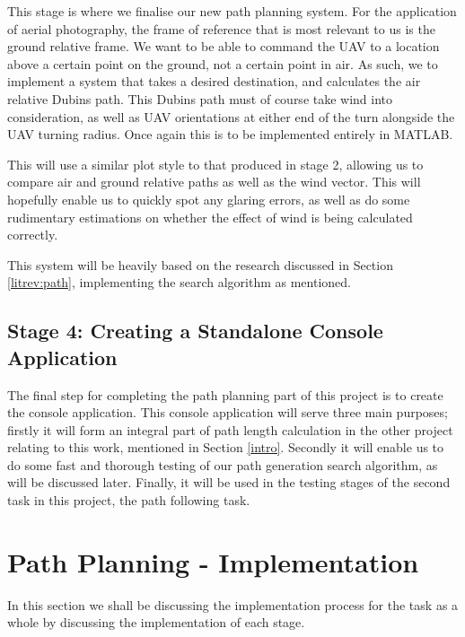 This stage is where we finalise our new path planning system. For the application of aerial photography, the frame of reference that is most relevant to us is the ground relative frame. We want to be able to command the UAV to a location above a certain point on the ground, not a certain point in air. As such, we to implement a system that takes a desired destination, and calculates the air relative Dubins path. This Dubins path must of course take wind into consideration, as well as UAV orientations at either end of the turn alongside the UAV turning radius. Once again this is to be implemented entirely in MATLAB. 

This will use a similar plot style to that produced in stage 2, allowing us to compare air and ground relative paths as well as the wind vector. This will hopefully enable us to quickly spot any glaring errors, as well as do some rudimentary estimations on whether the effect of wind is being calculated correctly.

This system will be heavily based on the research discussed in Section \ref{litrev:path}, implementing the search algorithm as mentioned.

\subsection{Stage 4: Creating a Standalone Console Application}
\label{task1:design:stage4}

The final step for completing the path planning part of this project is to create the console application. This console application will serve three main purposes; firstly it will form an integral part of path length calculation in the other project relating to this work, mentioned in Section \ref{intro}. Secondly it will enable us to do some fast and thorough testing of our path generation search algorithm, as will be discussed later. Finally, it will be used in the testing stages of the second task in this project, the path following task.

\section{Path Planning - Implementation}
\label{task1:implementation}

In this section we shall be discussing the implementation process for the task as a whole by discussing the implementation of each stage. 


